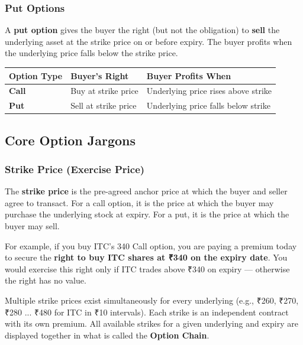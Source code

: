 \documentclass[12pt,openany]{book}
\begin{document}
\subsubsection{Put Options}

A \textbf{put option} gives the buyer the right (but not the obligation) to \textbf{sell} the underlying asset at the strike price on or before expiry. The buyer profits when the underlying price falls below the strike price.

\begin{center}
\scriptsize
\setlength{\tabcolsep}{3pt}
\begin{tabular}{|L{4.40cm}|L{4.40cm}|L{4.40cm}|}
\hline
Option Type & Buyer's Right & Buyer Profits When \\
\hline
\textbf{Call} & Buy at strike price & Underlying price rises above strike \\
\hline
\textbf{Put} & Sell at strike price & Underlying price falls below strike \\
\hline
\end{tabular}
\end{center}

\subsection{Core Option Jargons}

\subsubsection{Strike Price (Exercise Price)}

The \textbf{strike price} is the pre-agreed anchor price at which the buyer and seller agree to transact. For a call option, it is the price at which the buyer may purchase the underlying stock at expiry. For a put, it is the price at which the buyer may sell.

For example, if you buy ITC's 340 Call option, you are paying a premium today to secure the \textbf{right to buy ITC shares at ₹340 on the expiry date}. You would exercise this right only if ITC trades above ₹340 on expiry — otherwise the right has no value.

Multiple strike prices exist simultaneously for every underlying (e.g., ₹260, ₹270, ₹280 ... ₹480 for ITC in ₹10 intervals). Each strike is an independent contract with its own premium. All available strikes for a given underlying and expiry are displayed together in what is called the \textbf{Option Chain}.
\end{document}
